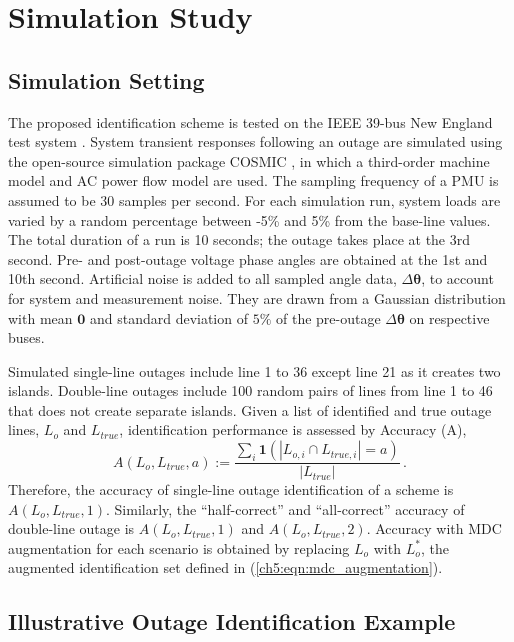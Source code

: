 \section{Simulation Study}
\label{ch5:sec:simulation}


\subsection{Simulation Setting}
The proposed identification scheme is tested on the IEEE 39-bus New England test system \cite{athay1979practical}. System transient responses following an outage are simulated using the open-source simulation package COSMIC \cite{Song2016}, in which a third-order machine model and AC power flow model are used. The sampling frequency of a PMU is assumed to be 30 samples per second. For each simulation run, system loads are varied by a random percentage between -5\% and 5\% from the base-line values. The total duration of a run is 10 seconds; the outage takes place at the 3rd second. Pre- and post-outage voltage phase angles are obtained at the 1st and 10th second. Artificial noise is added to all sampled angle data, $\Delta \boldsymbol{\theta}$, to account for system and measurement noise. They are drawn from a Gaussian distribution with mean $\mathbf{0}$ and standard deviation of $5\%$ of the pre-outage $\Delta\boldsymbol{\theta}$ on respective buses. 

Simulated single-line outages include line 1 to 36 except line 21 as it creates two islands. Double-line outages include 100 random pairs of lines from line 1 to 46 that does not create separate islands. Given a list of identified and true outage lines, $L_o$ and $L_{true}$, identification performance is assessed by Accuracy (A), 
\begin{equation}
\label{ch5:eqn:accuracy}
A(L_o, L_{true}, a):=\frac{\sum_i \mathbf{1}(\left| L_{o,i} \cap L_{true, i} \right| = a)}{\left| L_{true} \right|} \,.
\end{equation}
Therefore, the accuracy of single-line outage identification of a scheme is $A(L_o, L_{true}, 1)$. Similarly, the ``half-correct'' and ``all-correct'' accuracy of double-line outage is $A(L_o, L_{true}, 1)$ and $A(L_o, L_{true}, 2)$. Accuracy with MDC augmentation for each scenario is obtained by replacing $L_o$ with $L_o^*$, the augmented identification set defined in (\ref{ch5:eqn:mdc_augmentation}). 


\subsection{Illustrative Outage Identification Example}  

